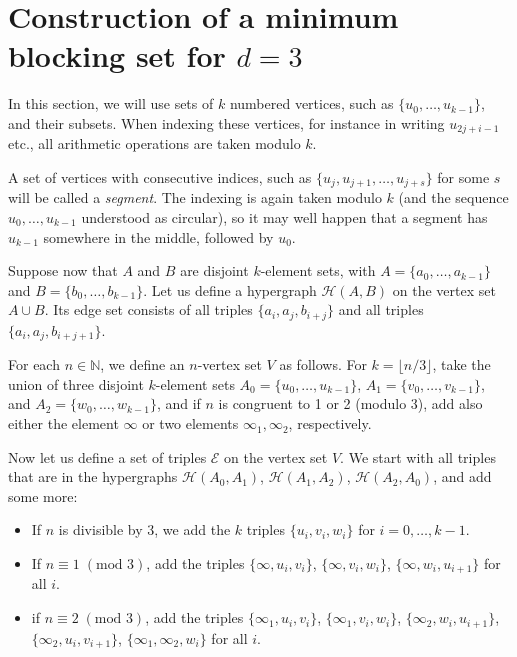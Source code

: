 \documentclass[11pt,a4paper]{article}
\begin{document}
\section{Construction of a minimum blocking set for \texorpdfstring{$d=3$}{}}\label{sec:construction3}

In this section, we will use sets of $k$ numbered vertices, such as $\{u_0,\dots,u_{k-1}\}$, and their subsets. When indexing these vertices, for instance in writing $u_{2j+i-1}$ etc., all arithmetic operations are taken modulo $k$.

A set of vertices with consecutive indices, such as $\{u_j,u_{j+1},\dots,u_{j+s}\}$ for some $s$ will be called a {\em segment}. The indexing is again taken modulo $k$ (and the sequence $u_0,\dots,u_{k-1}$ understood as circular), so it may well happen that a segment has $u_{k-1}$ somewhere in the middle, followed by $u_0$.

Suppose now that $A$ and $B$ are disjoint $k$-element sets, with $A=\{a_0,\dots,a_{k-1}\}$ and $B=\{b_0,\dots,b_{k-1}\}$. Let us define a hypergraph $\mathcal{H}(A,B)$ on the vertex set $A\cup B$. Its edge set consists of all triples $\{a_i,a_j,b_{i+j}\}$ and all triples $\{a_i,a_j,b_{i+j+1}\}$.

For each $n\in \mathbb{N}$, we define an $n$-vertex set $V$ as follows.
For $k=\lfloor n/3\rfloor$, take the union of three disjoint $k$-element sets $A_0=\{u_0,\dots,u_{k-1}\}$, $A_1=\{v_0,\dots,v_{k-1}\}$, and $A_2=\{w_0,\dots,w_{k-1}\}$, and if $n$ is congruent to 1 or 2 (modulo 3), add also either the element $\infty$ or two elements $\infty_1,\infty_2$, respectively.

 Now let us define a set of triples $\mathcal{E}$ on the vertex set $V$. We start with all triples that are in the hypergraphs $\mathcal{H}(A_0,A_1)$, $\mathcal{H}(A_1,A_2)$, $\mathcal{H}(A_2,A_0)$, and add some more:

 \begin{itemize}
     \item If $n$ is divisible by 3, we add the $k$ triples $\{u_i,v_i,w_i\}$ for $i=0,\dots,k-1$.
     \item If $n \equiv 1 \; ({\mbox{mod }} 3)$, add the triples $\{\infty, u_i, v_i\}$, $\{\infty, v_i,w_i\}$, $\{\infty, w_i,u_{i+1}\}$ for all $i$.
     \item if $n \equiv 2 \; ({\mbox{mod }} 3)$, add the triples $\{\infty_1,u_i,v_i\}$, $\{\infty_1,v_i,w_i\}$, $\{\infty_2,w_i,u_{i+1}\}$, $\{\infty_2,u_i,v_{i+1}\}$, $\{\infty_1,\infty_2,w_i\}$ for all $i$.
\end{itemize}
\end{document}
